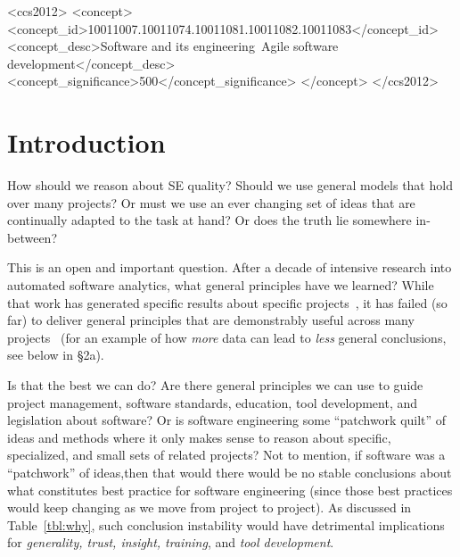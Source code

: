 \documentclass[sigconf]{acmart}
\theoremstyle{break}
\begin{document}
\begin{CCSXML}
<ccs2012>
<concept>
<concept_id>10011007.10011074.10011081.10011082.10011083</concept_id>
<concept_desc>Software and its engineering~Agile software 
development</concept_desc>
<concept_significance>500</concept_significance>
</concept>
</ccs2012>
\end{CCSXML}





\maketitle

\pagestyle{plain}

\section{Introduction}
How should we reason about SE quality?  Should we use  general models that hold over many projects? Or must we use an ever changing set of ideas that are   continually adapted to the task at hand? 
Or does the truth lie somewhere in-between?  

This is an open and important question. After a decade of intensive research into automated software analytics, what general principles have we learned? While that work has generated specific results about specific projects~\cite{Bird:2015,menzies2013software}, it has failed (so far) to deliver general principles that are demonstrably useful across many projects~\cite{menzies2013guest} (for an example of how {\em more} data can lead to {\em less} general conclusions, see below in {\S}2a).

Is that the best we can do? Are there general principles we can use to guide project management, software standards, education,   tool development, and legislation about software? 
Or is  software engineering some ``patchwork quilt'' of ideas and methods where it only makes sense to reason about specific, specialized, and small sets of related projects? Not to mention, if software was a ``patchwork'' of ideas,then that would  there would be no stable conclusions about what constitutes best practice for software engineering (since those best practices would keep changing as we move from project to project). As discussed in Table~\ref{tbl:why}, such conclusion instability would have detrimental implications for {\em generality, trust, insight, training}, and {\em tool development}.
\end{document}
